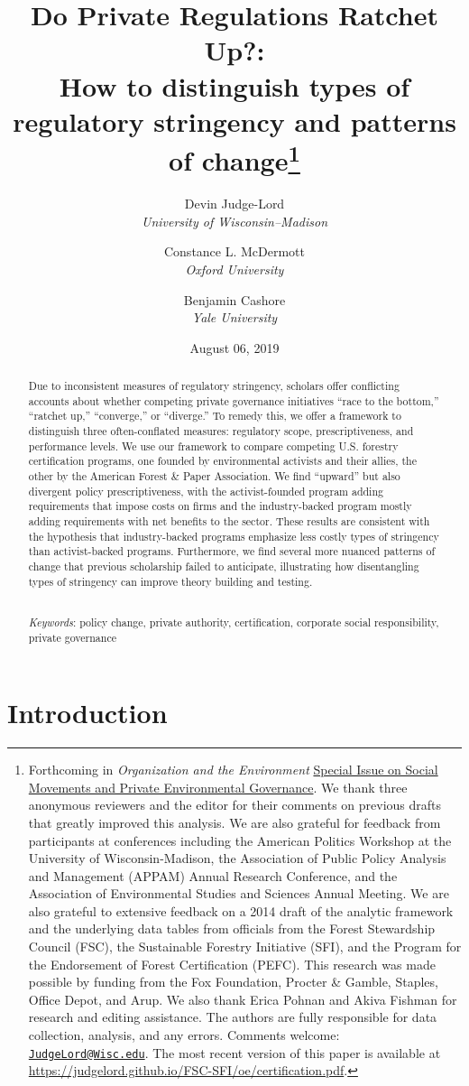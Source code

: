 \documentclass[
      12pt,
            Review ]{article}
\title{Do Private Regulations Ratchet Up?: 
           \\ How to distinguish types of regulatory stringency and patterns of change\thanks{Forthcoming in \emph{Organization and the Environment}
\href{https://journals.sagepub.com/doi/full/10.1177/1086026619853783}{Special
Issue on Social Movements and Private Environmental Governance}. We
thank three anonymous reviewers and the editor for their comments on
previous drafts that greatly improved this analysis. We are also
grateful for feedback from participants at conferences including the
American Politics Workshop at the University of Wisconsin-Madison, the
Association of Public Policy Analysis and Management (APPAM) Annual
Research Conference, and the Association of Environmental Studies and
Sciences Annual Meeting. We are also grateful to extensive feedback on a
2014 draft of the analytic framework and the underlying data tables from
officials from the Forest Stewardship Council (FSC), the Sustainable
Forestry Initiative (SFI), and the Program for the Endorsement of Forest
Certification (PEFC). This research was made possible by funding from
the Fox Foundation, Procter \& Gamble, Staples, Office Depot, and Arup.
We also thank Erica Pohnan and Akiva Fishman for research and editing
assistance. The authors are fully responsible for data collection,
analysis, and any errors. Comments welcome:
\href{mailto:JudgeLord@Wisc.edu}{\nolinkurl{JudgeLord@Wisc.edu}}. The
most recent version of this paper is available at
\url{https://judgelord.github.io/FSC-SFI/oe/certification.pdf}.}}
\author{ %
            Devin Judge-Lord  \\ \emph{University of Wisconsin--Madison} 
             \and 
            Constance L. McDermott  \\ \emph{Oxford University} 
             \and 
            Benjamin Cashore  \\ \emph{Yale University} 
            }
\date{August 06, 2019}
\begin{document}
 


  \maketitle




  \begin{abstract}
    \noindent Due to inconsistent measures of regulatory stringency, scholars offer
conflicting accounts about whether competing private governance
initiatives ``race to the bottom,'' ``ratchet up,'' ``converge,'' or
``diverge.'' To remedy this, we offer a framework to distinguish three
often-conflated measures: regulatory scope, prescriptiveness, and
performance levels. We use our framework to compare competing U.S.
forestry certification programs, one founded by environmental activists
and their allies, the other by the American Forest \& Paper Association.
We find ``upward'' but also divergent policy prescriptiveness, with the
activist-founded program adding requirements that impose costs on firms
and the industry-backed program mostly adding requirements with net
benefits to the sector. These results are consistent with the hypothesis
that industry-backed programs emphasize less costly types of stringency
than activist-backed programs. Furthermore, we find several more nuanced
patterns of change that previous scholarship failed to anticipate,
illustrating how disentangling types of stringency can improve theory
building and testing. 

          \hfill \\ 
      \noindent \emph{Keywords}: policy change, private authority, certification, corporate social
responsibility, private governance 
    
  \end{abstract}










\noindent 
      \doublespacing 
    \newpage

\section{Introduction}\label{introduction}
\end{document}
